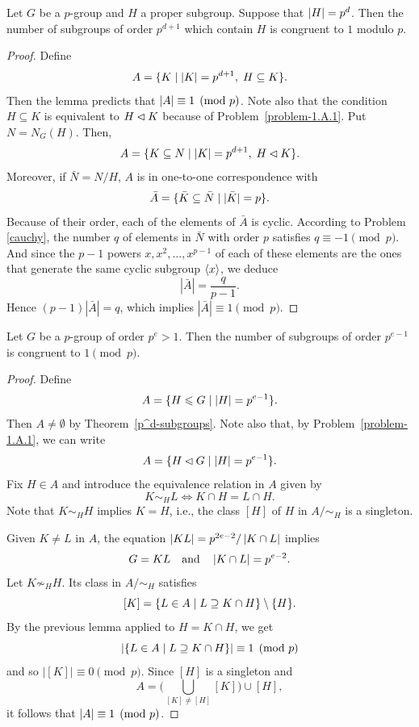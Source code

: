 \begin{lem}\label{lemma1}
     Let\/ $G$ be a $p$-group and $H$ a proper subgroup. Suppose that $\left\vert{H}\right\vert=p^d$. Then the number of subgroups of order $p^{d+1}$ which contain $H$ is congruent to $1$ modulo $p$.
\end{lem}

\begin{proof} Define
$$
    A=\{K\mid \left\vert{K}\right\vert=p^{d+1},\; H\subseteq K\}.
$$
Then the lemma predicts that $\left\vert{A}\right\vert\equiv1\pmod p$. Note also that the condition $H\subseteq K$ is equivalent to $H\lhd K$ because of Problem~\ref{problem-1.A.1}. Put $N=N_G(H)$. Then,
$$
    A=\{K\subseteq N\mid \left\vert{K}\right\vert=p^{d+1},\; H\lhd K\}.
$$
Moreover, if $\bar N=N/H$, $A$ is in one-to-one correspondence with
$$
    \bar A=\{\bar K\subseteq\bar N\mid|\bar K|=p\}.
$$
Because of their order, each of the elements of $\bar A$ is cyclic. According to Problem \ref{cauchy}, the number $q$ of elements in $\bar N$ with order $p$ satisfies $q\equiv-1\pmod p$. And since the $p-1$ powers $x, x^2,\dots, x^{p-1}$ of each of these elements are the ones that generate the same cyclic subgroup $\langle x\rangle$, we deduce
$$
    |\bar A| = \frac q{p-1}.
$$
Hence $(p-1)|\bar A|=q$, which implies $|\bar A|\equiv1\pmod p$.  \end{proof}

\begin{lem}\label{lemma2}
    Let\/ $G$ be a $p$-group of order $p^e>1$. Then the number of subgroups of order\/ $p^{e-1}$ is congruent to $1\pmod{p}$.
\end{lem}

\begin{proof} Define
$$
    A = \{H\leqslant G\mid\left\vert{H}\right\vert=p^{e-1}\}.
$$
Then $A\ne\emptyset$ by Theorem~\ref{p^d-subgroups}. Note also that, by Problem~\ref{problem-1.A.1}, we can write
$$
    A = \{H\lhd G\mid\left\vert{H}\right\vert=p^{e-1}\}.
$$
Fix $H\in A$ and introduce the equivalence relation in $A$ given by
$$
    K\sim_H L\iff K\cap H= L\cap H.
$$
Note that $K\sim_HH$ implies $K=H$, i.e., the class $[H]$ of $H$ in $A/{\sim_H}$ is a singleton.

Given $K\ne L$ in $A$, the equation $\left\vert{KL}\right\vert=p^{2e-2}/\left\vert{K\cap L}\right\vert$ implies
$$
    G = KL\quad\text{and}\quad\left\vert{K\cap L}\right\vert=p^{e-2}.
$$
Let $K\not\sim_HH$. Its class in $A/{\sim_H}$ satisfies
$$
    [K] = \{L\in A\mid L\supseteq K\cap H\}\setminus\{H\}.
$$
By the previous lemma applied to $H=K\cap H$, we get 
$$
    |\{L\in A\mid L\supseteq K\cap H\}| \equiv 1\pmod p
$$
and so $|[K]|\equiv0\pmod p$. Since $[H]$ is a singleton and
$$
    A = \bigg(\bigcup_{[K]\ne[H]}[K]\bigg)\cup [H],
$$
it follows that $\left\vert{A}\right\vert\equiv1\pmod p$.  \end{proof}

